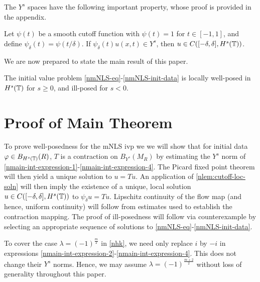 %
The $Y^s$ spaces have the following important property, whose proof
is provided in the appendix.
\begin{lemma}
	\label{nlem:cutoff-loc-soln}
	Let $\psi(t)$ be a smooth cutoff function with $\psi(t) =1$ for $t \in [-1,
  1]$, and define $\psi_{\delta}(t) = \psi(t/\delta)$. If
  $\psi_{\delta}(t)u(x,t) \in Y^s$, then $u \in C([-\delta, \delta], H^s(\mathbb{T}))$.
\end{lemma}

We are now prepared to state the main result of this paper.
%
%
%
%
%
%
%
%
%
%
\begin{theorem}
\label{nthm:main}
The initial value problem 
\eqref{nmNLS-eq}-\eqref{nmNLS-init-data} is locally well-posed in $H^s(\mathbb{T})$ for $s \ge
0$, and ill-posed for $s <0$. %
%
\end{theorem} 
%
%
%
%
%
%
%
%
%
%
%
%
\section{Proof of Main Theorem}
%
%
To prove well-posedness for the mNLS ivp we we will 
show that for initial data $\varphi \in B_{H^{s}(\mathbb{T})}(R)$, $T$ is a contraction on
$B_{Y^{s}}(M_{R})$ by estimating the $Y^s$
norm of \eqref{nmain-int-expression-1}-\eqref{nmain-int-expression-4}. The 
Picard fixed point theorem will
then yield a unique solution to
$u = Tu$. An application of
\cref{nlem:cutoff-loc-soln} will then imply the existence of a unique, local
solution $u \in C([-\delta, \delta], H^s(\mathbb{T}))$ to
$\psi_{\delta} u = Tu$. Lipschitz continuity of the flow map (and hence, uniform
continuity) will follow from estimates used to establish the contraction
mapping. The proof of ill-posedness will follow via counterexample 
by selecting an appropriate sequence of
solutions to \eqref{nmNLS-eq}-\eqref{nmNLS-init-data}. 
%
\begin{framed}
\begin{remark}
  To cover the case $\lambda = (-1)^{\frac{m}{2}}$ in \eqref{nhk}, we need only
  replace $i$ by $-i$ in
  expressions \eqref{nmain-int-expression-2}-\eqref{nmain-int-expression-4}. This
  does not change their $Y^s$ norms. Hence, we may assume $\lambda =
  (-1)^{\frac{m+2}{2}}$ without loss of generality throughout this paper.
\label{nrem:lambda-arb}
\end{remark}
\end{framed}


